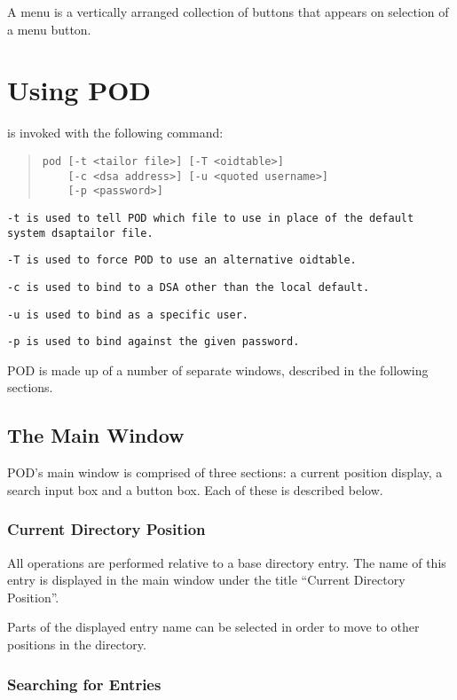 A menu is a vertically arranged collection of buttons that appears
on selection of a menu button.

\section {Using POD}

 is invoked with the following command:

\begin{quote}\begin{verbatim}
pod [-t <tailor file>] [-T <oidtable>] 
    [-c <dsa address>] [-u <quoted username>] 
    [-p <password>]
\end{verbatim}\end{quote}

\tt -t\rm \ is used to tell POD which  file to use in place of the
default system dsaptailor file.

\tt -T\rm \ is used to force POD to use an alternative oidtable.

\tt -c\rm \ is used to bind to a DSA other than the local default.

\tt -u\rm \ is used to bind as a specific user.

\tt -p\rm \ is used to bind against the given password.

POD is made up of a number of separate windows,
described in the following sections.

\subsection {The Main Window}

POD's main window is comprised of three sections:
a current position display,
a search input box and a button box.
Each of these is described below.

\subsubsection {Current Directory Position}

All operations are performed relative to a base directory entry.
The name of this entry is displayed in the main window under the title 
``Current Directory Position''.

Parts of the displayed entry name can be selected in order to move to
other positions in the directory.

\subsubsection {Searching for Entries}

